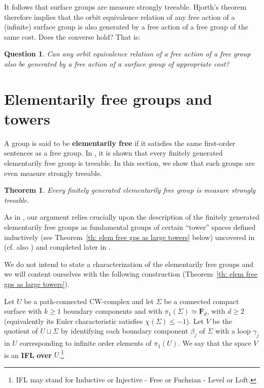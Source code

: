 \documentclass[11pt]{amsart}
\theoremstyle{definition}
\theoremstyle{plain}
\newtheorem{thm}[definition]{Theorem}
\newtheorem{question}[definition]{Question}
\newcommand{\<}{\langle}
\renewcommand{\>}{\rangle}
\newcommand{\FF}{\mathbf{F}}
\newcommand{\disjointunion}{\sqcup}
\newcommand{\define}[1]{\textbf{#1}}
\newcommand{\pmp}{\text{p.m.p.}}
\begin{document}
It follows that surface groups are measure strongly treeable.  Hjorth's theorem \cite{Hjo-cost-att} therefore implies that the orbit equivalence relation of any free \pmp{} action of a (infinite) surface group is also generated by a free action of a free group of the same cost.  Does the converse hold?  That is:
\begin{question}\label{question:Hjorthsurface}
 Can any orbit equivalence relation of a free \pmp{} action of a free group also be generated by a free action of a surface group of appropriate cost?
\end{question}






\section{Elementarily free groups and towers}\label{sec:elemfree}

A group is said to be \define{elementarily free} if it satisfies the same first-order sentences as a free group. In \cite{BTW-07},  it is shown that every finitely generated elementarily free group is treeable.
 In this section, we show that such groups are even measure strongly treeable.

\begin{thm}\label{elemfreetreeable}
  Every finitely generated elementarily free group is measure strongly treeable.
\end{thm}

As in \cite{BTW-07}, our argument relies crucially upon the description of the finitely generated elementarily free groups as fundamental groups of certain ``tower'' spaces defined inductively (see Theorem~\ref{th: elem free gps as large towers} below)
uncovered in \cite[Proposition 6]{SeVI} (cf. also \cite{KhM1}) and completed later in \cite{Guirardel-Levitt-Sklinos-2020}.

We do not intend to state a characterization of the elementarily free groups and we will content ourselves with the following construction (Theorem~\ref{th: elem free gps as large towers}).

Let $U$ be a path-connected CW-complex and let $\Sigma$ be a connected compact surface with $k\geq 1$ boundary components and with $\pi_1(\Sigma)\simeq \FF_d$, with $d\geq 2$ (equivalently its Euler characteristic satisfies $\chi(\Sigma)\leq -1$).
Let $V$ be the quotient of $U \disjointunion \Sigma$ by identifying each boundary component $\beta_j$ of $\Sigma$ with a loop $\gamma_j$ in $U$ corresponding to infinite order elements of $\pi_1(U)$.
We say that the space $V$ is an \define{IFL} 
\define{over} $U$.\footnote{IFL may stand for Inductive or Injective - Free or Fuchsian -  Level or Loft.}
\end{document}
